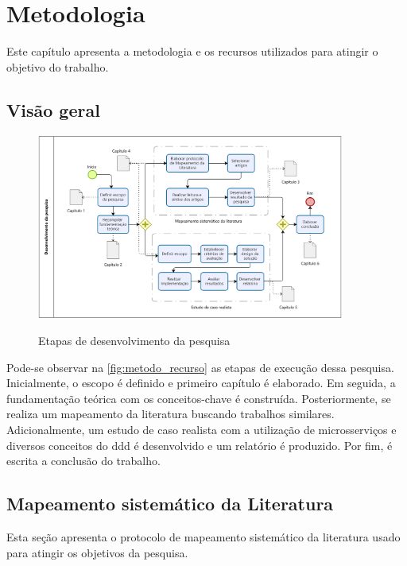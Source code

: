 \chapter{Metodologia}
\label{cap:metodologia}
Este capítulo apresenta a metodologia e os recursos utilizados para atingir o objetivo do trabalho.

\section{Visão geral}
\begin{figure}[h]
    \centering
    \caption{Etapas de desenvolvimento da pesquisa}
    \includegraphics[width=0.9\textwidth]{media/bpmn_metodo_recurso.png}
    \label{fig:metodo_recurso}
\end{figure}

Pode-se observar na \autoref{fig:metodo_recurso} as etapas de execução dessa pesquisa. Inicialmente, o escopo é definido e primeiro capítulo é elaborado. Em seguida, a fundamentação teórica com os conceitos-chave é construída. Posteriormente, se realiza um mapeamento da literatura buscando trabalhos similares. Adicionalmente, um estudo de caso realista com a utilização de microsserviços e diversos conceitos do \acrshort{ddd} é desenvolvido e um relatório é produzido. Por fim, é escrita a conclusão do trabalho.

\section{Mapeamento sistemático da Literatura}
Esta seção apresenta o protocolo de mapeamento sistemático da literatura usado para atingir os objetivos da pesquisa.

